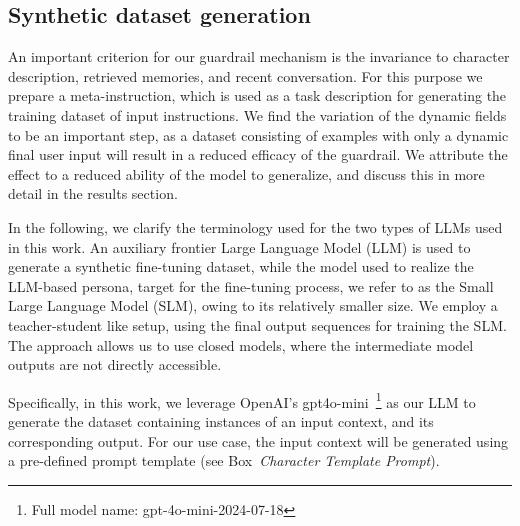 \documentclass[letterpaper]{article}
\newcommand{\allm}{OpenAI's gpt4o-mini}  %
\newcommand{\fullallm}{gpt-4o-mini-2024-07-18}
\begin{document}
\subsection{Synthetic dataset generation}
An important criterion for our guardrail mechanism is the invariance to character description, retrieved memories, and recent conversation. For this purpose we prepare a meta-instruction, which is used as a task description for generating the training dataset of input instructions. We find the variation of the dynamic fields to be an important step, as a dataset consisting of examples with only a dynamic final user input will result in a reduced efficacy of the guardrail. We attribute the effect to a reduced ability of the model to generalize, and discuss this in more detail in the results section.

In the following, we clarify the terminology used for the two types of LLMs used in this work. An auxiliary frontier Large Language Model (LLM) is used to generate a synthetic fine-tuning dataset, while the model used to realize the LLM-based persona, target for the fine-tuning process, we refer to as the Small Large Language Model (SLM), owing to its relatively smaller size. We employ a teacher-student like setup, using the final output sequences for training the SLM. The approach allows us to use closed models, where the intermediate model outputs are not directly accessible.

Specifically, in this work, we leverage \allm~\footnote{Full model name: \fullallm} as our LLM to generate the dataset containing instances of an input context, and its corresponding output. For our use case, the input context will be generated using a pre-defined prompt template (see Box~\textit{Character Template Prompt}).
\end{document}
